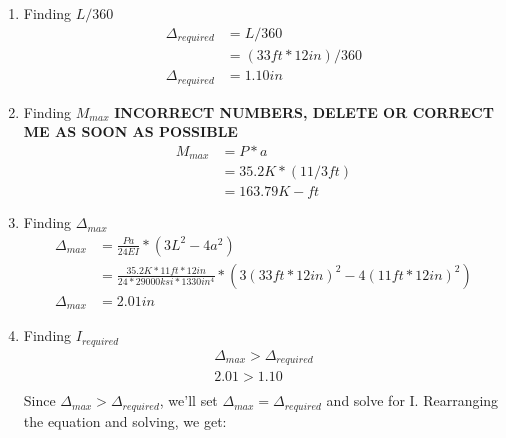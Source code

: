 \documentclass{report} %
\begin{document}
\begin{enumerate}
    \item Finding $L/360$
        \begin{equation*}
            \begin{aligned}
                \Delta _{required} &= L/360 \\
                            &= (33ft * 12in)/360\\
                \Delta _{required} &= 1.10in    
            \end{aligned}
        \end{equation*}
    \item Finding $M_{max}$ \textbf{INCORRECT NUMBERS, DELETE OR CORRECT ME AS SOON AS POSSIBLE}
        \begin{equation*}
            \begin{aligned}
                M_{max} &= P * a \\
                        &= 35.2K * (11/3ft) \\  %
                        &= 163.79 K-ft
            \end{aligned}
        \end{equation*} 
    \item Finding $\Delta _{max}$
        \begin{equation*}
            \begin{aligned}
                \Delta _{max} &= \frac{Pa}{24EI} * (3L^2-4a^2)\\ %
                        &= \frac{35.2K * 11ft * 12in}{24 * 29000ksi * 1330in^4} * (3(33ft * 12in)^2-4(11ft * 12in)^2) \\
                \Delta _{max} &= 2.01in    
            \end{aligned}
        \end{equation*}
    \item Finding $I_{required}$
        \begin{equation*}
            \begin{aligned}
                \Delta _{max} > \Delta _{required} \\
                2.01 > 1.10 \\
            \end{aligned}
        \end{equation*}
        Since $\Delta _{max} > \Delta _{required}$, we'll set $\Delta _{max} = \Delta _{required}$ and solve for I. Rearranging the equation and solving, we get:

\end{enumerate}
\end{document}
